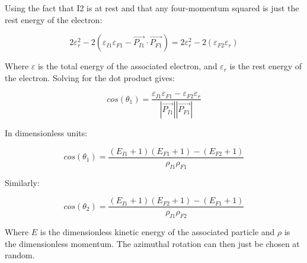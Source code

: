 \documentclass[]{article}
\begin{document}
Using the fact that I2 is at rest and that any four-momentum squared is just the rest energy of the electron:

\[ 
2\varepsilon_r^2 - 2(\varepsilon_{I1}\varepsilon_{F1}- \vec{P_{I1}}\cdot\vec{P_{F1}})=2\varepsilon_r^2 - 2(\varepsilon_{F2}\varepsilon_r)
\] 

Where $\varepsilon$ is the total energy of the associated electron, and $\varepsilon_r$ is the rest energy of the electron. Solving for the dot product gives:

\[ 
cos(\theta_1)=\frac{\varepsilon_{I1}\varepsilon_{F1}-\varepsilon_{F2}\varepsilon_r}{ \left| \vec{P_{I1}} \right| \left| \vec{P_{F1}} \right|  }
 \]
 
In dimensionless units:

\begin{equation}
cos(\theta_1)=\frac{(E_{I1}+1)(E_{F1}+1)-(E_{F2}+1)}{\rho_{I1}\rho_{F1}}
\end{equation}

Similarly:

\begin{equation}
cos(\theta_2)=\frac{(E_{I1}+1)(E_{F2}+1)-(E_{F1}+1)}{\rho_{I1}\rho_{F2}}
\end{equation}

Where $E$ is the dimensionless kinetic energy of the associated particle and $\rho$ is the dimensionless momentum. The azimuthal rotation can then just be chosen at random.
\end{document}
